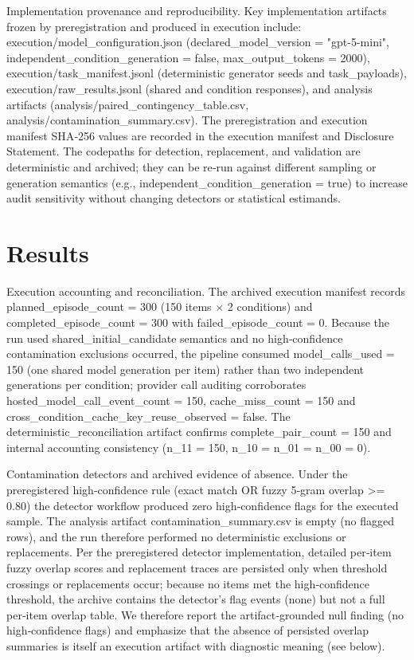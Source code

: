 \documentclass[conference]{IEEEtran}
\begin{document}
Implementation provenance and reproducibility. Key implementation artifacts frozen by preregistration and produced in execution include: execution/model\_configuration.json (declared\_model\_version = "gpt-5-mini", independent\_condition\_generation = false, max\_output\_tokens = 2000), execution/task\_manifest.jsonl (deterministic generator seeds and task\_payloads), execution/raw\_results.jsonl (shared and condition responses), and analysis artifacts (analysis/paired\_contingency\_table.csv, analysis/contamination\_summary.csv). The preregistration and execution manifest SHA‑256 values are recorded in the execution manifest and Disclosure Statement. The codepaths for detection, replacement, and validation are deterministic and archived; they can be re‑run against different sampling or generation semantics (e.g., independent\_condition\_generation = true) to increase audit sensitivity without changing detectors or statistical estimands.

\section{Results}
Execution accounting and reconciliation. The archived execution manifest records planned\_episode\_count = 300 (150 items \ensuremath{\times} 2 conditions) and completed\_episode\_count = 300 with failed\_episode\_count = 0. Because the run used shared\_initial\_candidate semantics and no high‑confidence contamination exclusions occurred, the pipeline consumed model\_calls\_used = 150 (one shared model generation per item) rather than two independent generations per condition; provider call auditing corroborates hosted\_model\_call\_event\_count = 150, cache\_miss\_count = 150 and cross\_condition\_cache\_key\_reuse\_observed = false. The deterministic\_reconciliation artifact confirms complete\_pair\_count = 150 and internal accounting consistency (n\_11 = 150, n\_10 = n\_01 = n\_00 = 0).

Contamination detectors and archived evidence of absence. Under the preregistered high‑confidence rule (exact match OR fuzzy 5‑gram overlap >= 0.80) the detector workflow produced zero high‑confidence flags for the executed sample. The analysis artifact contamination\_summary.csv is empty (no flagged rows), and the run therefore performed no deterministic exclusions or replacements. Per the preregistered detector implementation, detailed per‑item fuzzy overlap scores and replacement traces are persisted only when threshold crossings or replacements occur; because no items met the high‑confidence threshold, the archive contains the detector's flag events (none) but not a full per‑item overlap table. We therefore report the artifact‑grounded null finding (no high‑confidence flags) and emphasize that the absence of persisted overlap summaries is itself an execution artifact with diagnostic meaning (see below).
\end{document}
